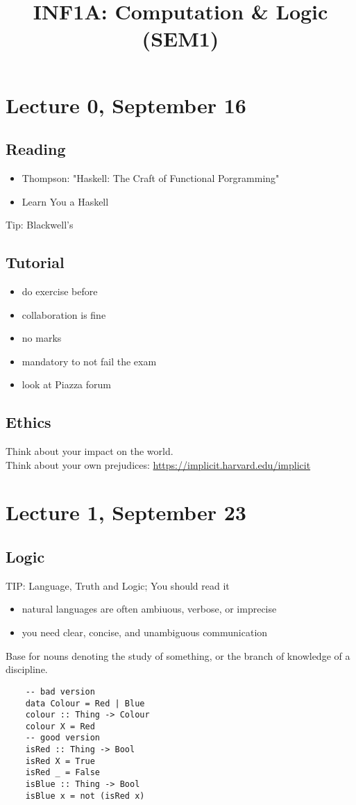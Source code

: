 \documentclass{article}
\begin{document}
\title{INF1A: Computation \& Logic (SEM1)}
\tableofcontents
\pagebreak
\section{Lecture 0, September 16}
\subsection{Reading}
\begin{itemize}
    \item Thompson: "Haskell: The Craft of Functional Porgramming"
    \item Learn You a Haskell
\end{itemize}
Tip: Blackwell's\\
\subsection{Tutorial}
\begin{itemize}
    \item do exercise before
    \item collaboration is fine
    \item no marks
    \item mandatory to not fail the exam
\end{itemize}
\begin{itemize}
    \item look at Piazza forum
\end{itemize}
\subsection{Ethics}
Think about your impact on the world.\\
Think about your own prejudices:
\url{https://implicit.harvard.edu/implicit}
\section{Lecture 1, September 23}
\subsection{Logic}
TIP: Language, Truth and Logic; You should read it
\begin{itemize}
    \item natural languages are often ambiuous, verbose, or imprecise
    \item you need clear, concise, and unambiguous communication   
\end{itemize}
Base for nouns denoting the study of something, or the branch of knowledge of a discipline.
\begin{verbatim}
    -- bad version
    data Colour = Red | Blue
    colour :: Thing -> Colour
    colour X = Red
    -- good version
    isRed :: Thing -> Bool
    isRed X = True
    isRed _ = False
    isBlue :: Thing -> Bool
    isBlue x = not (isRed x)
\end{verbatim}
\end{document}
